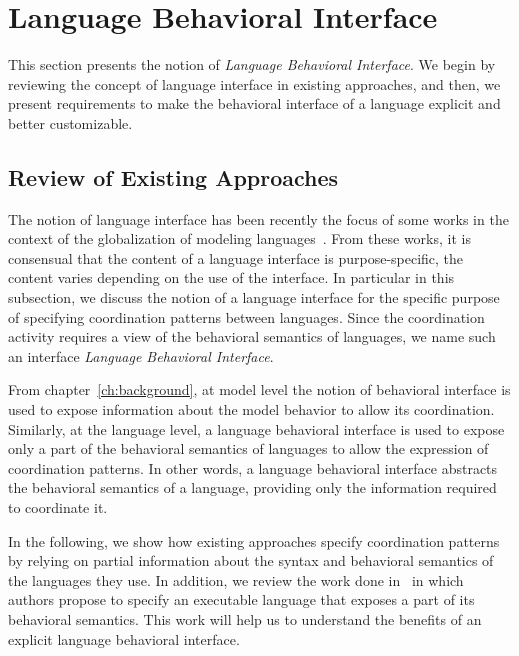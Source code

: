 \section{Language Behavioral Interface}
This section presents the notion of \emph{Language Behavioral Interface}. We begin by reviewing the concept of language interface in existing approaches, and then, we present requirements to make the behavioral interface of a language explicit and better customizable.    

\subsection{Review of Existing Approaches}

The notion of language interface has been recently the focus of some works in the context of the globalization of modeling languages~\cite{GML_ch1,GML_ch3,GML_ch4,degueule2015melange}. From these works, it is consensual that the content of a language interface is purpose-specific, \ie the content varies depending on the use of the interface. In particular in this subsection, we discuss the notion of a language interface for the specific purpose of specifying coordination patterns between languages. Since the coordination activity requires a view of the behavioral semantics of languages, we name such an interface \emph{Language Behavioral Interface}.
	
From chapter~\ref{ch:background}, at model level the notion of behavioral interface is used to expose information about the model behavior to allow its coordination. Similarly, at the language level, a language behavioral interface is used to expose only a part of the behavioral semantics of languages to allow the expression of coordination patterns. In other words, a language behavioral interface abstracts the behavioral semantics of a language, providing only the information required to coordinate it. 
 
In the following, we show how existing approaches specify coordination patterns by relying on partial information about the syntax and behavioral semantics of the languages they use. In addition, we review the work done in~\cite{sle13-combemale} in which authors propose to specify an executable language that exposes a part of its behavioral semantics. This work will help us to understand the benefits of an explicit language behavioral interface.    

